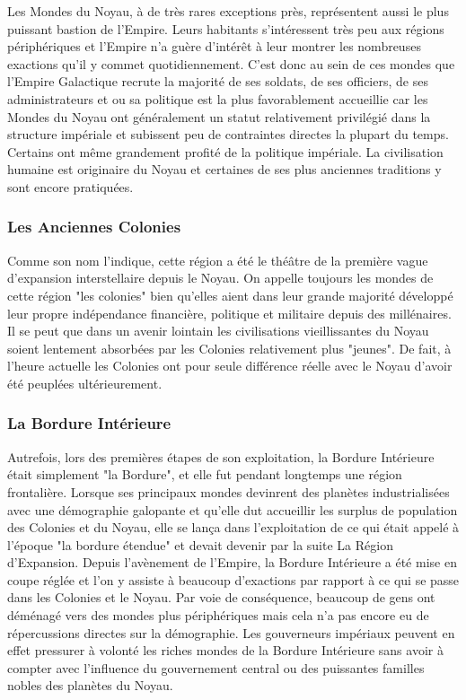 \documentclass[twoside]{article}
\begin{document}
Les Mondes du Noyau, à de très rares exceptions près, représentent aussi le plus puissant bastion de l'Empire. Leurs habitants s'intéressent très peu aux régions périphériques et l'Empire n'a guère d'intérêt à leur montrer les nombreuses exactions qu'il y commet quotidiennement. C'est donc au sein de ces mondes que l'Empire Galactique recrute la majorité de ses soldats, de ses officiers, de ses administrateurs et ou sa politique est la plus favorablement accueillie car les Mondes du Noyau ont généralement un statut relativement privilégié dans la structure impériale et subissent peu de contraintes directes la plupart du temps. Certains ont même grandement profité de la politique impériale. La civilisation humaine est originaire du Noyau et certaines de ses plus anciennes traditions y sont encore pratiquées.

\subsubsection{Les Anciennes Colonies}
Comme son nom l'indique, cette région a été le théâtre de la première vague d'expansion interstellaire depuis le Noyau. On appelle toujours les mondes de cette région "les colonies" bien qu'elles aient dans leur grande majorité développé leur propre indépendance financière, politique et militaire depuis des millénaires. Il se peut que dans un avenir lointain les civilisations vieillissantes du Noyau soient lentement absorbées par les Colonies relativement plus "jeunes". De fait, à l'heure actuelle les Colonies ont pour seule différence réelle avec le Noyau d'avoir été peuplées ultérieurement.

\subsubsection{La Bordure Intérieure}
Autrefois, lors des premières étapes de son exploitation, la Bordure Intérieure était simplement "la Bordure", et elle fut pendant longtemps une région frontalière. Lorsque ses principaux mondes devinrent des planètes industrialisées avec une démographie galopante et qu'elle dut accueillir les surplus de population des Colonies et du Noyau, elle se lança dans l'exploitation de ce qui était appelé à l'époque "la bordure étendue" et devait devenir par la suite La Région d'Expansion. Depuis l'avènement de l'Empire, la Bordure Intérieure a été mise en coupe réglée et l'on y assiste à beaucoup d'exactions par rapport à ce qui se passe dans les Colonies et le Noyau. Par voie de conséquence, beaucoup de gens ont déménagé vers des mondes plus périphériques mais cela n'a pas encore eu de répercussions directes sur la démographie. Les gouverneurs impériaux peuvent en effet pressurer à volonté les riches mondes de la Bordure Intérieure sans avoir à compter avec l'influence du gouvernement central ou des puissantes familles nobles des planètes du Noyau.
\end{document}
